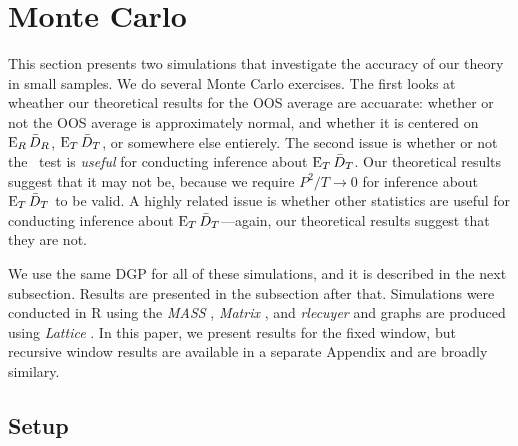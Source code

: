 \documentclass[12pt]{article}
\begin{document}
\section{Monte Carlo}
\label{sec:mc}

This section presents two simulations that investigate the accuracy of
our theory in small samples.
We do several Monte Carlo exercises. The first looks at wheather our
theoretical results for the OOS average are accuarate: whether or not
the OOS average is approximately normal, and whether it is centered on
$\operatorname{E}_R \bar{D}_{R}$, $\operatorname{E}_T \bar{D}_{T}$, or somewhere else entierely. The second
issue is whether or not the \oost\ test is \emph{useful} for
conducting inference about $\operatorname{E}_T \bar{D}_{T}$. Our theoretical results
suggest that it may not be, because we require $P^2/T \to 0$ for
inference about $\operatorname{E}_T \bar{D}_{T}$ to be valid. A highly related issue is
whether other statistics are useful for conducting inference about
$\operatorname{E}_T \bar{D}_{T}$---again, our theoretical results suggest that they are
not.

We use the same DGP for all of these simulations, and it is described
in the next subsection. Results are presented in the subsection after
that. Simulations were conducted in R \citep{Rde:10} using the
\emph{MASS} \citep{VeR:02}, \emph{Matrix} \citep{BM:13}, and
\emph{rlecuyer} \citep{SR:12} and graphs are produced using
\emph{Lattice} \citep{Sar:10}. In this paper, we present results for
the fixed window, but recursive window results are available in a
separate Appendix and are broadly similary.

\subsection{Setup}
\label{sec:simulation-design}
\end{document}
